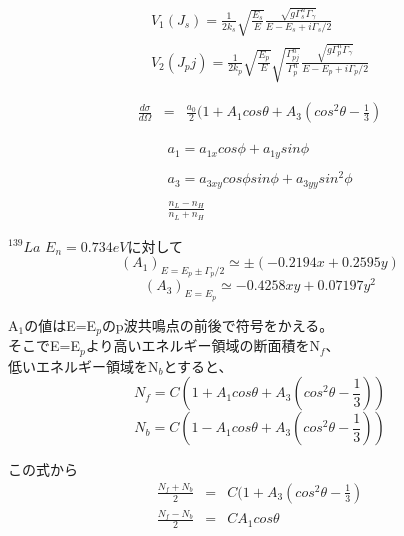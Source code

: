 \documentclass[11pt,a4paper]{jsarticle}
\begin{document}
\begin{eqnarray}
V_1(J_s)= \frac{1}{2k_s}\sqrt{\frac{E_s}{E}}\frac{\sqrt {g\Gamma_s^n \Gamma_\gamma}}{E-E_s +i \Gamma_s/2}   \nonumber \\
V_2(J_pj)= \frac{1}{2k_p}\sqrt{\frac{E_p}{E}}\sqrt{\frac{\Gamma_{pj}^{n}}{\Gamma^n_p}}\frac{\sqrt {g\Gamma_p^n \Gamma_\gamma}}{E-E_p +i \Gamma_p/2}
\end{eqnarray}







\begin{eqnarray}
\frac{d\sigma}{d\Omega} 
&= &\frac{a_0}{2}(1+A_1 cos\theta
+A_3(cos^2 \theta-\frac{1}{3})   \nonumber
\end{eqnarray}








\begin{eqnarray}
a_1=a_{1x}cos\phi+a_{1y}sin\phi  \\
\\
a_3=a_{3xy}cos\phi sin\phi+a_{3yy}sin^2\phi \\
\\
\frac{n_L-n_H}{n_L+n_H}
\end{eqnarray}






\hspace{3cm}

$^{139}La$ $E_n=0.734eV$に対して
$$
(A_1)_{E=E_p\pm\Gamma_p/2} \simeq \pm (-0.2194x+0.2595y)  
$$
$$
(A_3)_{E=E_p} \simeq -0.4258xy+0.07197y^2
$$

\hspace{3cm}
A$_1$の値はE=E$_p$のp波共鳴点の前後で符号をかえる。\\
\hspace{3cm}
そこでE=E$_p$より高いエネルギー領域の断面積をN$_f$、\\
\hspace{3cm}
低いエネルギー領域をN$_b$とすると、
$$
N_f=C(1+A_1 cos\theta + A_3 (cos^2 \theta-\frac{1}{3}))
$$
$$
N_b=C(1-A_1 cos\theta + A_3 (cos^2 \theta-\frac{1}{3}))
$$

\hspace{3cm}
この式から
\begin{eqnarray}
\frac{N_f+N_b}{2} &=&C(1+A_3(cos^2\theta-\frac{1}{3})  \nonumber \\
\frac{N_f-N_b}{2}&=&CA_1cos\theta \nonumber
\end{eqnarray}
\end{document}
